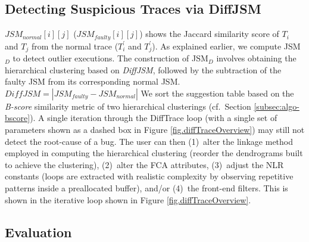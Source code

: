 \subsection{Detecting Suspicious Traces via DiffJSM}
$JSM_{normal}[i][j]$ ($JSM_{faulty}[i][j]$) shows the Jaccard similarity score of $T_i$ and $T_j$ from the normal trace ($T_i^\prime$ and $T_j^\prime$).
% 
%
As explained earlier, we compute
JSM$_{D}$ to detect outlier executions.
%
The construction
of JSM$_{D}$ 
involves obtaining the hierarchical clustering based on \textit{DiffJSM},
followed by the subtraction of the faulty JSM from its corresponding normal JSM.
$DiffJSM = |JSM_{faulty} - JSM_{normal}|$
%
We sort the suggestion table based on the \textit{B-score}
similarity metric of two hierarchical clusterings \cite{fowlkes83} (cf.~Section \ref{subsec:algo-bscore}).
%
A single iteration through the
DiffTrace loop
(with a single set of parameters shown as a dashed box in Figure \ref{fig.diffTraceOverview})
may still not detect the root-cause of a bug.
%
The user can then (1)~alter the linkage method employed in computing the hierarchical clustering
(reorder the dendrograms built to achieve the clustering),
(2)~alter the FCA attributes, (3)~adjust the NLR constants (loops are extracted with
realistic complexity by observing repetitive patterns inside a preallocated buffer),
and/or (4)~the front-end filters.
%
This is shown in the iterative loop shown in
Figure \ref{fig.diffTraceOverview}.

\subsection{Evaluation}

%

%
%


